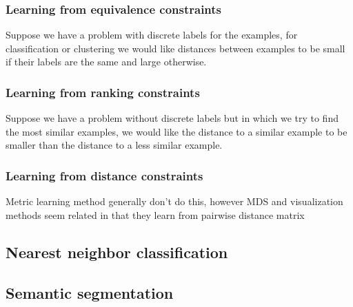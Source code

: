 \documentclass[a4paper,titlepage]{article}
\begin{document}
\subsubsection{Learning from equivalence constraints}

Suppose we have a problem with discrete labels for the examples, for classification or clustering we would like distances between examples to be small if their labels are the same and large otherwise.



\subsubsection{Learning from ranking constraints}

Suppose we have a problem without discrete labels but in which we try to find the most similar examples, we would like the distance to a similar example to be smaller than the distance to a less similar example.

\subsubsection{Learning from distance constraints}

Metric learning method generally don't do this, however MDS and visualization methods seem related in that they learn from pairwise distance matrix

\subsection{Nearest neighbor classification}

\subsection{Semantic segmentation}
\end{document}
